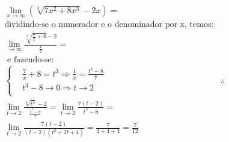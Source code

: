 \begin{ex}
\begin{align}
&\lim_{x\rightarrow \infty} \left(\sqrt[3]{7x^2+8x^3}-2x\right)=\nonumber\\
&\text{dividindo-se o numerador e o denominador por x, temos:}\nonumber\\
&\lim_{\rightarrow \infty} \frac{\sqrt[3]{\frac{7}{x}+8}-2}{\frac{1}{x}}=\nonumber\\
&\text{ e fazendo-se:}\nonumber\\
&\begin{cases}
&\frac{7}{x}+8=t^3\Rightarrow\frac{1}{x}=\frac{t^3-8}{7}\\
&t^3-8\rightarrow 0\Rightarrow t\rightarrow 2\nonumber\\
\end{cases}
&\therefore\nonumber\\
&\lim_{t\rightarrow 2} \frac{\sqrt[3]{t^3}-2}{\frac{t^3-8}{7}}=\lim_{t\rightarrow 2} \frac{7(t-2)}{t^3-8}=\nonumber\\
&\lim_{t\rightarrow 2} \frac{7(t-2)}{(t-2)(t^2+2t+4)}=\frac{7}{4+4+4}=\frac{7}{12}\nonumber
\end{align}
\end{ex}